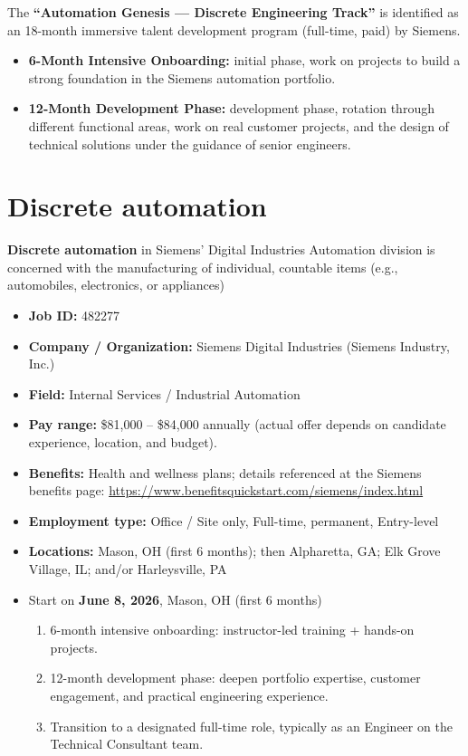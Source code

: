 \documentclass[11pt]{article}
\begin{document}
The \textbf{``Automation Genesis — Discrete Engineering Track''} is identified as 
an 18-month immersive talent development program (full-time, paid) by Siemens.
\begin{itemize}
  \item \textbf{6-Month Intensive Onboarding:} initial phase, work on projects to build a strong foundation in the Siemens automation portfolio.
  \item \textbf{12-Month Development Phase:} development phase, rotation through different functional areas, work on real customer projects, and the design of technical solutions under the guidance of senior engineers.
\end{itemize}

\section*{Discrete automation}
\textbf{Discrete automation} in Siemens' Digital Industries Automation division is concerned with the manufacturing of individual, countable
items (e.g., automobiles, electronics, or appliances)

\begin{itemize}
  \item \textbf{Job ID:} 482277
  \item \textbf{Company / Organization:} Siemens Digital Industries (Siemens Industry, Inc.)
  \item \textbf{Field:} Internal Services / Industrial Automation
  \item \textbf{Pay range:} \$81,000 -- \$84,000 annually (actual offer depends on candidate experience, location, and budget).
  \item \textbf{Benefits:} Health and wellness plans; details referenced at the Siemens benefits page: \url{https://www.benefitsquickstart.com/siemens/index.html}
  \item \textbf{Employment type:} Office / Site only, Full-time, permanent, Entry-level
  \item \textbf{Locations:} Mason, OH (first 6 months); then Alpharetta, GA; Elk Grove Village, IL; and/or Harleysville, PA
  \item Start on \textbf{June 8, 2026}, Mason, OH (first 6 months) 
  \begin{enumerate}[label=\arabic*., leftmargin=*]
    \item 6-month intensive onboarding: instructor-led training + hands-on projects.
    \item 12-month development phase: deepen portfolio expertise, customer engagement, and practical engineering experience.
    \item Transition to a designated full-time role, typically as an Engineer on the Technical Consultant team.
  \end{enumerate}
\end{itemize}
\end{document}
